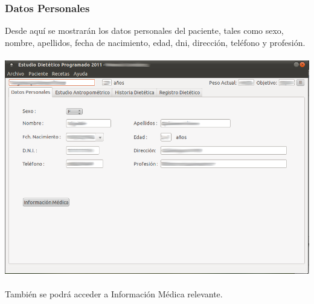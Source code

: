 \documentclass[12pt, spanish]{article}
\begin{document}
\subsubsection{Datos Personales}
Desde aquí se mostrarán los datos personales del paciente, tales como sexo, nombre, apellidos, fecha de nacimiento, edad, dni, dirección, teléfono y profesión.\\\\
\includegraphics[scale=0.5]{Image/paciente-datos.png}\\\\
También se podrá acceder a Información Médica relevante.
\end{document}
